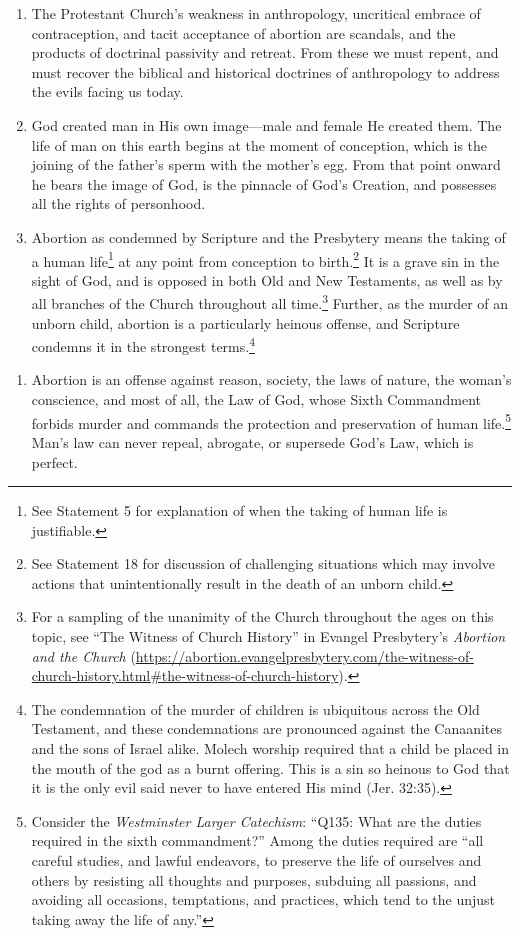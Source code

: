 \documentclass[
]{book}
\providecommand{\tightlist}{%
  \setlength{\itemsep}{0pt}\setlength{\parskip}{0pt}}
\begin{document}
\begin{enumerate}
\def\labelenumi{\arabic{enumi}.}
\item
  The Protestant Church's weakness in anthropology, uncritical embrace of contraception, and tacit acceptance of abortion are scandals, and the products of doctrinal passivity and retreat. From these we must repent, and must recover the biblical and historical doctrines of anthropology to address the evils facing us today.
\item
  God created man in His own image---male and female He created them. The life of man on this earth begins at the moment of conception, which is the joining of the father's sperm with the mother's egg. From that point onward he bears the image of God, is the pinnacle of God's Creation, and possesses all the rights of personhood.
\item
  Abortion as condemned by Scripture and the Presbytery means the taking of a human life\footnote{See Statement 5 for explanation of when the taking of human life is justifiable.} at any point from conception to birth.\footnote{See Statement 18 for discussion of challenging situations which may involve actions that unintentionally result in the death of an unborn child.} It is a grave sin in the sight of God, and is opposed in both Old and New Testaments, as well as by all branches of the Church throughout all time.\footnote{For a sampling of the unanimity of the Church throughout the ages on this topic, see ``The Witness of Church History'' in Evangel Presbytery's \emph{Abortion and the Church} (\url{https://abortion.evangelpresbytery.com/the-witness-of-church-history.html\#the-witness-of-church-history}).} Further, as the murder of an unborn child, abortion is a particularly heinous offense, and Scripture condemns it in the strongest terms.\footnote{The condemnation of the murder of children is ubiquitous across the Old Testament, and these condemnations are pronounced against the Canaanites and the sons of Israel alike. Molech worship required that a child be placed in the mouth of the god as a burnt offering. This is a sin so heinous to God that it is the only evil said never to have entered His mind (Jer. 32:35).}
\end{enumerate}

\begin{enumerate}
\def\labelenumi{\arabic{enumi}.}
\setcounter{enumi}{3}
\tightlist
\item
  Abortion is an offense against reason, society, the laws of nature, the woman's conscience, and most of all, the Law of God, whose Sixth Commandment forbids murder and commands the protection and preservation of human life.\footnote{Consider the \emph{Westminster Larger Catechism}: ``Q135: What are the duties required in the sixth commandment?'' Among the duties required are ``all careful studies, and lawful endeavors, to preserve the life of ourselves and others by resisting all thoughts and purposes, subduing all passions, and avoiding all occasions, temptations, and practices, which tend to the unjust taking away the life of any.''} Man's law can never repeal, abrogate, or supersede God's Law, which is perfect.
\end{enumerate}
\end{document}
